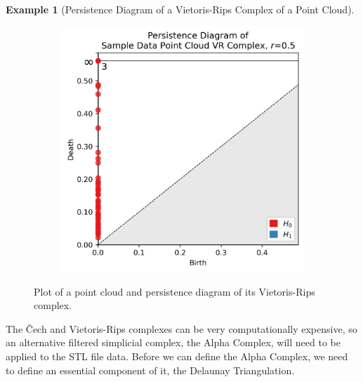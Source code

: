\documentclass[ma]{uncgdissertationexp}
\theoremstyle{plain}
\theoremstyle{definition}
\newtheorem{example}[theorem]{Example}
\theoremstyle{remark}
\begin{document}
\begin{example}[Persistence Diagram of a Vietoris-Rips Complex of a Point Cloud]
\begin{figure}[H]
\begin{subfigure}[b]{0.45\textwidth}
        \includegraphics[width=\textwidth]{point_cloud_persdia_vr_0_5.png}
    \end{subfigure}
    \caption{Plot of a point cloud and persistence diagram of its Vietoris-Rips complex.}
    \label{fig:point_cloud_persdia}
\end{figure}
\end{example}

\newpage
\par The Čech and Vietoris-Rips complexes can be very computationally expensive, so an alternative filtered simplicial complex, the Alpha Complex, will need to be applied to the STL file data. Before we can define the Alpha Complex, we need to define an essential component of it, the Delaunay Triangulation.
\end{document}
